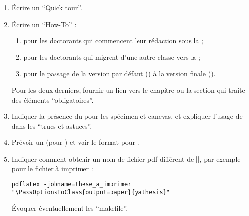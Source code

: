 \begin{enumerate}
\item Écrire un \foreignquote{english}{Quick tour}.
\item Écrire un \foreignquote{english}{How-To} :
  \begin{enumerate}
  \item pour les doctorants qui commencent leur rédaction sous la \yatCl{} ;
  \item pour les doctorants qui migrent d'une autre classe vers la \yatCl{} ;
  \item pour le passage de la version par défaut () à la
    version finale ().
  \end{enumerate}
  Pour les deux derniers, fournir un lien vers le chapitre ou la section qui
  traite des éléments \enquote{obligatoires}.
\item Indiquer la présence du  pour les spécimen et canevas, et
  expliquer l'usage de  dans les \enquote{trucs et astuces}.
\item Prévoir un  (pour ) et voir le format
  pour .
\item Indiquer comment obtenir un nom de fichier \acrshort{pdf} différent de
  |\jobname|, par exemple pour le fichier à imprimer :
  \lstset{escapechar=}
\begin{lstlisting}
pdflatex -jobname=these_a_imprimer "\PassOptionsToClass{output=paper}{yathesis}"
\end{lstlisting}
  \lstset{escapechar="}%
Évoquer éventuellement les \enquote{makefile}.
\end{enumerate}

